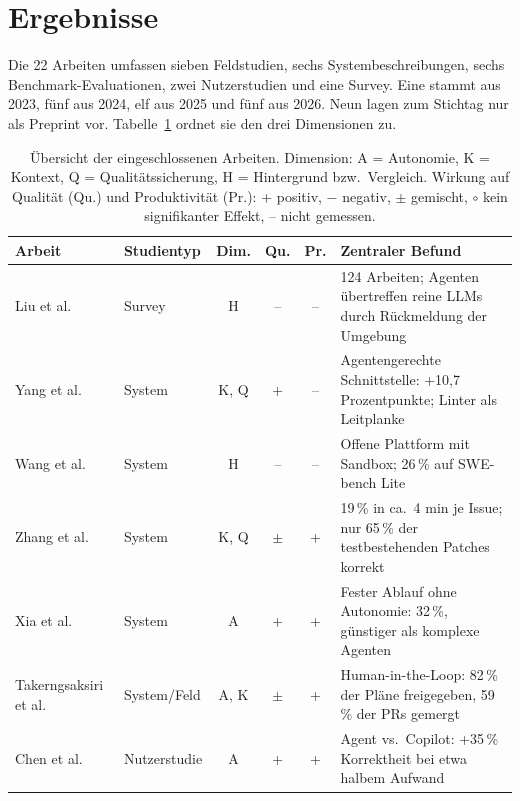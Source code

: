 \section{Ergebnisse}
\label{sec:ergebnisse}

Die 22 Arbeiten umfassen sieben Feldstudien, sechs Systembeschreibungen, sechs Benchmark-Evaluationen, zwei Nutzerstudien und eine Survey. Eine stammt aus 2023, fünf aus 2024, elf aus 2025 und fünf aus 2026. Neun lagen zum Stichtag nur als Preprint vor. Tabelle~\ref{tab:uebersicht} ordnet sie den drei Dimensionen zu.

\begin{table}[t]
\caption{Übersicht der eingeschlossenen Arbeiten. Dimension: A = Autonomie, K = Kontext, Q = Qualitätssicherung, H = Hintergrund bzw.\ Vergleich. Wirkung auf Qualität (Qu.) und Produktivität (Pr.): + positiv, $-$ negativ, $\pm$ gemischt, $\circ$ kein signifikanter Effekt, -- nicht gemessen.}
\label{tab:uebersicht}
\centering
\footnotesize
\setlength{\tabcolsep}{4pt}
\begin{tabular}{llcccl}
\hline
\textbf{Arbeit} & \textbf{Studientyp} & \textbf{Dim.} & \textbf{Qu.} & \textbf{Pr.} & \textbf{Zentraler Befund} \\
\hline
Liu et al.~\cite{liu2024agentsurvey} & Survey & H & -- & -- & 124 Arbeiten; Agenten übertreffen reine LLMs durch Rückmeldung der Umgebung \\
Yang et al.~\cite{yang2024sweagent} & System & K, Q & + & -- & Agentengerechte Schnittstelle: +10,7 Prozentpunkte; Linter als Leitplanke \\
Wang et al.~\cite{wang2025openhands} & System & H & -- & -- & Offene Plattform mit Sandbox; 26\,\% auf SWE-bench Lite \\
Zhang et al.~\cite{zhang2024autocoderover} & System & K, Q & $\pm$ & + & 19\,\% in ca.\ 4 min je Issue; nur 65\,\% der testbestehenden Patches korrekt \\
Xia et al.~\cite{xia2025agentless} & System & A & + & + & Fester Ablauf ohne Autonomie: 32\,\%, günstiger als komplexe Agenten \\
Takerngsaksiri et al.~\cite{takerngsaksiri2025hula} & System/Feld & A, K & $\pm$ & + & Human-in-the-Loop: 82\,\% der Pläne freigegeben, 59\,\% der PRs gemergt \\
Chen et al.~\cite{chen2025codewithme} & Nutzerstudie & A & + & + & Agent vs.\ Copilot: +35\,\% Korrektheit bei etwa halbem Aufwand \\

\end{tabular}
\end{table}
